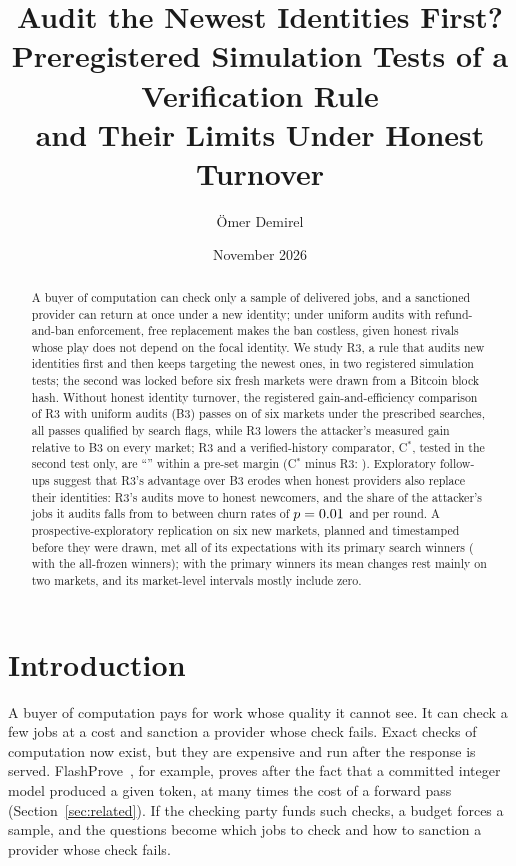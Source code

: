 \documentclass[11pt]{article}
\title{Audit the Newest Identities First?\\Preregistered Simulation Tests of a Verification Rule\\and Their Limits Under Honest Turnover}
\author{Ömer Demirel}
\date{November 2026}
\begin{document}
\maketitle

\begin{abstract}
A buyer of computation can check only a sample of delivered jobs, and a sanctioned provider can return at once under a new identity; under uniform audits with refund-and-ban enforcement, free replacement makes the ban costless, given honest rivals whose play does not depend on the focal identity. We study R3, a rule that audits new identities first and then keeps targeting the newest ones, in two registered simulation tests; the second was locked before six fresh markets were drawn from a Bitcoin block hash. Without honest identity turnover, the registered gain-and-efficiency comparison of R3 with uniform audits (B3) passes on  of six markets under the prescribed searches, all passes qualified by search flags, while R3 lowers the attacker's measured gain relative to B3 on every market; R3 and a verified-history comparator, C$^*$, tested in the second test only, are ``'' within a pre-set margin (C$^*$ minus R3: ). Exploratory follow-ups suggest that R3's advantage over B3 erodes when honest providers also replace their identities: R3's audits move to honest newcomers, and the share of the attacker's jobs it audits falls from  to  between churn rates of $p = 0.01$ and  per round. A prospective-exploratory replication on six new markets, planned and timestamped before they were drawn, met all  of its expectations with its primary search winners ( with the all-frozen winners); with the primary winners its mean changes rest mainly on two markets, and its market-level intervals mostly include zero.
\end{abstract}

\section{Introduction}\label{sec:intro}
A buyer of computation pays for work whose quality it cannot see. It can check a few jobs at a cost and sanction a provider whose check fails. Exact checks of computation now exist, but they are expensive and run after the response is served.
FlashProve~\cite{rinberg2026flashprove}, for example, proves after the fact that a committed integer model produced a given token, at many times the cost of a forward pass (Section~\ref{sec:related}). If the checking party funds such checks, a budget forces a sample, and the questions become which jobs to check and how to sanction a provider whose check fails.
\end{document}
